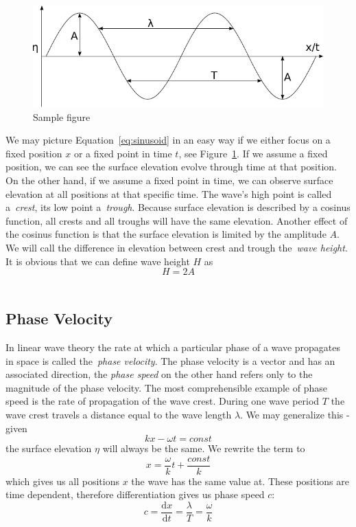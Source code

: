 \begin{figure}[b]
	\centering
	\includegraphics[width=\textwidth]{figures/sinusoid}
	\caption{Sample figure}
	\label{fig:sinusoid}
\end{figure}
%
We may picture Equation~\ref{eq:sinusoid} in an easy way if we either focus on a fixed position $x$
or a fixed point in time $t$, see Figure~\ref{fig:sinusoid}. If we assume a fixed position, we can
see the surface elevation evolve through time at that position. On the other hand, if we assume a fixed
point in time, we can observe surface elevation at all positions at that specific time.
The wave's high point is called a~\emph{crest}, its low point a~\emph{trough}. Because surface elevation
is described by a cosinus function, all crests and all troughs will have the
same elevation. Another effect of the cosinus function is that the surface
elevation is limited by the amplitude $A$. We will call the difference in
elevation between crest and trough the~\emph{wave height}. It is obvious that we
can define wave height $H$ as
\begin{equation}
 H = 2A
\end{equation}
\\

\subsection{Phase Velocity}
\label{sec:phase_velocity}
In linear wave theory the rate at which a particular phase of a wave propagates in space is called
the~\emph{phase velocity}. The phase velocity is a vector and has an associated direction,
the \emph{phase speed} on the other hand refers only to the magnitude of the phase velocity.
The most comprehensible example of phase speed is the rate of propagation of the wave crest.
During one wave period $T$ the wave crest travels a distance equal to the wave length $\lambda$.
We may generalize this - given
\begin{equation}
  kx - \omega t = const
\end{equation}
the surface elevation $\eta$ will always be the same. We rewrite the term to
\begin{equation}
  x = \frac{\omega}{k}t + \frac{const}{k}
\end{equation}
which gives us all positions $x$ the wave has the same value at. These positions are time dependent,
therefore differentiation gives us phase speed $c$:
\begin{equation}
  c = \frac{\mathrm dx}{\mathrm dt} = \frac{\lambda}{T} = \frac{\omega}{k}
\end{equation}

